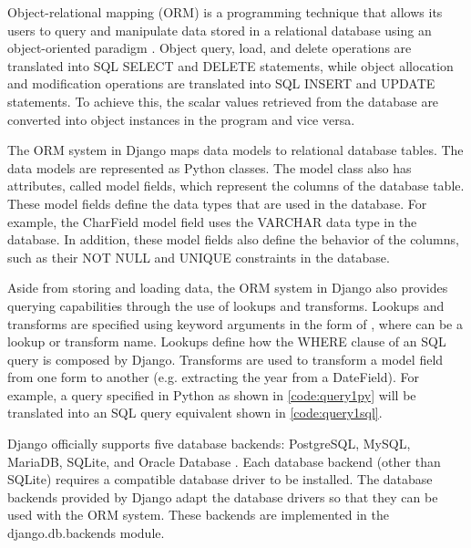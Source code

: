 Object-relational mapping (ORM) is a programming technique that allows its
users to query and manipulate data stored in a relational database using an
object-oriented paradigm \cite{linskey:orm}. Object query, load, and delete
operations are translated into SQL SELECT and DELETE statements, while object
allocation and modification operations are translated into SQL INSERT and
UPDATE statements. To achieve this, the scalar values retrieved from the
database are converted into object instances in the program and vice versa.

The ORM system in Django maps data models to relational database tables. The
data models are represented as Python classes. The model class also has
attributes, called model fields, which represent the columns of the database
table. These model fields define the data types that are used in the database.
For example, the CharField model field uses the VARCHAR data type in the
database. In addition, these model fields also define the behavior of the
columns, such as their NOT NULL and UNIQUE constraints in the database.

Aside from storing and loading data, the ORM system in Django also provides
querying capabilities through the use of lookups and transforms. Lookups and
transforms are specified using keyword arguments in the form of
, where  can be a lookup or
transform name. Lookups define how the WHERE clause of an SQL query is composed
by Django. Transforms are used to transform a model field from one form to
another (e.g. extracting the year from a DateField). For example, a query
specified in Python as shown in \autoref{code:query1py} will be translated into
an SQL query equivalent shown in \autoref{code:query1sql}.





Django officially supports five database backends: PostgreSQL, MySQL, MariaDB,
SQLite, and Oracle Database \cite{django:databases}. Each database backend
(other than SQLite) requires a compatible database driver to be installed. The
database backends provided by Django adapt the database drivers so that they
can be used with the ORM system. These backends are implemented in the
django.db.backends module.

